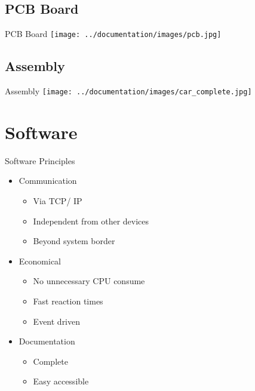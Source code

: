 \documentclass{beamer}
\begin{document}
\subsection{PCB Board}

\begin{frame}{PCB Board}
\centering
\texttt{[image: ../documentation/images/pcb.jpg]}
\end{frame}

\subsection{Assembly}

\begin{frame}{Assembly}
\centering
\texttt{[image: ../documentation/images/car\_complete.jpg]}
\end{frame}

\section{Software}

\begin{frame}{Software Principles}
\begin{itemize}
\item Communication
	\begin{itemize}
	\item Via TCP/ IP
	\item Independent from other devices
	\item Beyond system border
	\end{itemize}
	\vspace{2mm}
	
\item<2-> Economical
	\begin{itemize}
	\item No unnecessary CPU consume
	\item Fast reaction times
	\item Event driven
	\end{itemize}
	\vspace{2mm}
	
\item<3-> Documentation
	\begin{itemize}
	\item Complete
	\item Easy accessible
	\end{itemize}
\end{itemize}
\end{frame}
\end{document}
